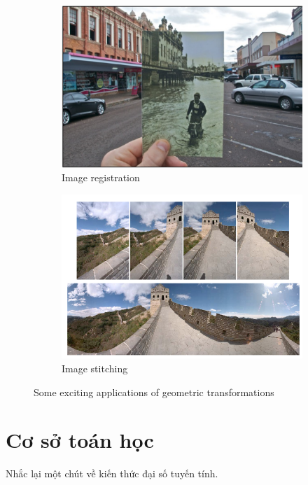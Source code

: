 \documentclass{article}
\begin{document}
\begin{figure}[ht!]
    \centering
    \begin{subfigure}[b]{0.6\linewidth}             \includegraphics[width=\linewidth]{fig1.png}
    \caption{Image registration}
    \end{subfigure}
    
    \begin{subfigure}[b]{0.6\linewidth}           \includegraphics[width=\linewidth]{fig2.png}
    \caption{Image stitching}
    \end{subfigure}

    \caption{Some exciting applications of geometric transformations}
    \label{fig2}
\end{figure}
\section{Cơ sở toán học}
Nhắc lại một chút về kiến thức đại số tuyến tính. 
\end{document}
